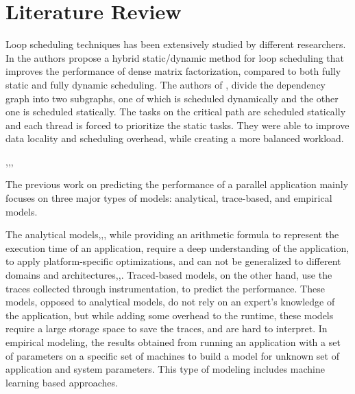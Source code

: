 \section{Literature Review}

Loop scheduling techniques has been extensively studied by different researchers. In \cite{donfack2012hybrid} the authors propose a hybrid static/dynamic method for loop scheduling that improves the performance of dense matrix factorization, compared to both fully static and fully dynamic scheduling. The authors of \cite{donfack2012hybrid}, divide the dependency graph into two subgraphs, one of which is scheduled dynamically and the other one is scheduled statically. The tasks on the critical path are scheduled statically and each thread is forced to prioritize the static tasks\cite{donfack2012hybrid}. They were able to improve data locality and scheduling overhead, while creating a more balanced workload. 

\cite{xue2007locality}
 \cite{tang1986processor},\cite{polychronopoulos1987guided},\cite{hummel1992factoring},\cite{kruskal1985allocating}
	




The previous work on predicting the performance of a parallel application mainly focuses on three major types of models: analytical,  trace-based, and empirical models\cite{malakar2018benchmarking}. 

The analytical models\cite{blagojevic2008modeling},\cite{kerbyson2001predictive},\cite{valiant1990bridging}, while providing an arithmetic formula to represent the execution time of an application, require a deep understanding of the application, to apply platform-specific optimizations, and can not be generalized to different domains and architectures\cite{lee2007methods},\cite{sun2017automated},\cite{pllana2007performance}.
Traced-based models, on the other hand, use the traces collected through instrumentation, to predict the performance. These models, opposed to analytical models, do not rely on an expert's knowledge of the application, but while adding some overhead to the runtime, these models require a large storage space to save the traces, and are hard to interpret\cite{sun2017automated}.   
In empirical modeling, the results obtained from running an application with a set of parameters on a specific set of machines to build a model for unknown set of application and system parameters\cite{malakar2018benchmarking}. This type of modeling includes machine learning based approaches.

